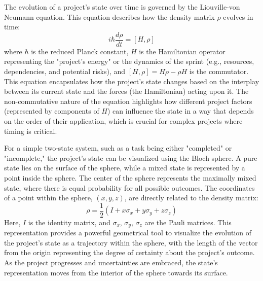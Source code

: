 \documentclass{article}
\begin{document}
The evolution of a project's state over time is governed by the Liouville-von Neumann equation. This equation describes how the density matrix $\rho$ evolves in time:
$$
i\hbar\frac{d\rho}{dt} = [H, \rho]
$$
where $\hbar$ is the reduced Planck constant, $H$ is the Hamiltonian operator representing the "project's energy" or the dynamics of the sprint (e.g., resources, dependencies, and potential risks), and $[H, \rho] = H\rho - \rho H$ is the commutator. This equation encapsulates how the project's state changes based on the interplay between its current state and the forces (the Hamiltonian) acting upon it. The non-commutative nature of the equation highlights how different project factors (represented by components of $H$) can influence the state in a way that depends on the order of their application, which is crucial for complex projects where timing is critical.

For a simple two-state system, such as a task being either "completed" or "incomplete," the project's state can be visualized using the Bloch sphere. A pure state lies on the surface of the sphere, while a mixed state is represented by a point inside the sphere. The center of the sphere represents the maximally mixed state, where there is equal probability for all possible outcomes. The coordinates of a point within the sphere, $(x, y, z)$, are directly related to the density matrix:
$$
\rho = \frac{1}{2}(I + x\sigma_x + y\sigma_y + z\sigma_z)
$$
Here, $I$ is the identity matrix, and $\sigma_x$, $\sigma_y$, $\sigma_z$ are the Pauli matrices. This representation provides a powerful geometrical tool to visualize the evolution of the project's state as a trajectory within the sphere, with the length of the vector from the origin representing the degree of certainty about the project's outcome. As the project progresses and uncertainties are embraced, the state's representation moves from the interior of the sphere towards its surface.
\end{document}
